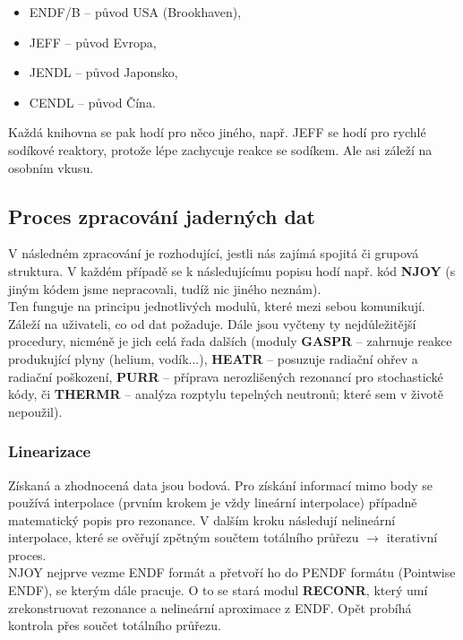 \begin{itemize}
  \item ENDF/B -- původ USA (Brookhaven),
  \item JEFF -- původ Evropa,
  \item JENDL -- původ Japonsko,
  \item CENDL -- původ Čína.
\end{itemize}

Každá knihovna se pak hodí pro něco jiného, např. JEFF se hodí pro rychlé sodíkové reaktory, protože lépe zachycuje reakce se sodíkem. Ale asi záleží na osobním vkusu.

\subsection{Proces zpracování jaderných dat}

V následném zpracování je rozhodující, jestli nás zajímá spojitá či grupová struktura. V každém případě se k následujícímu popisu hodí např. kód \textbf{NJOY} (s jiným kódem jsme nepracovali, tudíž nic jiného neznám).\\

Ten funguje na principu jednotlivých modulů, které mezi sebou komunikují. Záleží na uživateli, co od dat požaduje. Dále jsou vyčteny ty nejdůležitější procedury, nicméně je jich celá řada dalších (moduly \textbf{GASPR} -- zahrnuje reakce produkující plyny (helium, vodík...), \textbf{HEATR} -- posuzuje radiační ohřev a radiační poškození, \textbf{PURR} -- příprava nerozlišených rezonancí pro stochastické kódy, či \textbf{THERMR} -- analýza rozptylu tepelných neutronů; které sem v životě nepoužil).\\

\subsubsection{Linearizace}

Získaná a zhodnocená data jsou bodová. Pro získání informací mimo body se používá interpolace (prvním krokem je vždy lineární interpolace) případně matematický popis pro rezonance. V dalším kroku následují nelineární interpolace, které se ověřují zpětným součtem totálního průřezu $\rightarrow$ iterativní proces.\\

NJOY nejprve vezme ENDF formát a přetvoří ho do PENDF formátu (Pointwise ENDF), se kterým dále pracuje. O to se stará modul \textbf{RECONR}, který umí zrekonstruovat rezonance a nelineární aproximace z ENDF. Opět probíhá kontrola přes součet totálního průřezu.

